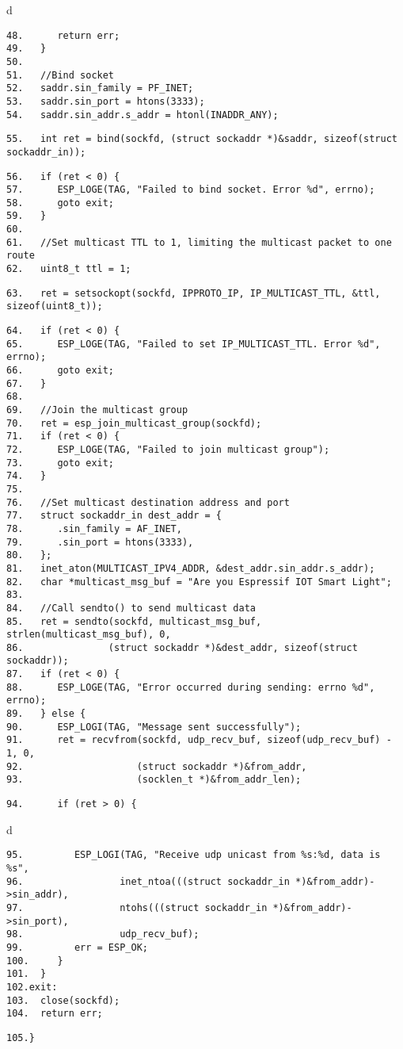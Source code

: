\documentclass[a4paper,12pt]{book}
\begin{document}
\begin{codebloc}
\begin{tabular}{d}
\vspace{2pt}
\begin{verbatim}
48.      return err;
49.   }
50.	
51.   //Bind socket
52.   saddr.sin_family = PF_INET;
53.   saddr.sin_port = htons(3333);
54.   saddr.sin_addr.s_addr = htonl(INADDR_ANY);
\end{verbatim}
\verb|55.   |\fontsize{9.5pt}{10pt}\selectfont\verb|int ret = bind(sockfd, (struct sockaddr *)&saddr, sizeof(struct sockaddr_in));|
\footnotesize
\begin{verbatim}
56.   if (ret < 0) {
57.      ESP_LOGE(TAG, "Failed to bind socket. Error %d", errno);
58.      goto exit;
59.   }
60.	
61.   //Set multicast TTL to 1, limiting the multicast packet to one route
62.   uint8_t ttl = 1;
\end{verbatim}
\verb|63.   |\fontsize{9.5pt}{10pt}\selectfont\verb|ret = setsockopt(sockfd, IPPROTO_IP, IP_MULTICAST_TTL, &ttl, sizeof(uint8_t));|
\footnotesize
\begin{verbatim}
64.   if (ret < 0) {
65.      ESP_LOGE(TAG, "Failed to set IP_MULTICAST_TTL. Error %d", errno);
66.      goto exit;
67.   }
68.	
69.   //Join the multicast group
70.   ret = esp_join_multicast_group(sockfd);
71.   if (ret < 0) {
72.      ESP_LOGE(TAG, "Failed to join multicast group");
73.      goto exit;
74.   }
75.	
76.   //Set multicast destination address and port
77.   struct sockaddr_in dest_addr = {
78.      .sin_family = AF_INET,
79.      .sin_port = htons(3333),
80.   };
81.   inet_aton(MULTICAST_IPV4_ADDR, &dest_addr.sin_addr.s_addr);
82.   char *multicast_msg_buf = "Are you Espressif IOT Smart Light";
83.	
84.   //Call sendto() to send multicast data
85.   ret = sendto(sockfd, multicast_msg_buf, strlen(multicast_msg_buf), 0,
86.               (struct sockaddr *)&dest_addr, sizeof(struct sockaddr));
87.   if (ret < 0) {
88.      ESP_LOGE(TAG, "Error occurred during sending: errno %d", errno);
89.   } else {
90.      ESP_LOGI(TAG, "Message sent successfully");
91.      ret = recvfrom(sockfd, udp_recv_buf, sizeof(udp_recv_buf) - 1, 0,
92.                    (struct sockaddr *)&from_addr,
93.                    (socklen_t *)&from_addr_len);
\end{verbatim}
\verb|94.      if (ret > 0) {|
\end{tabular}
\end{codebloc}

\begin{codebloc}
\begin{tabular}{d}
\vspace{2pt}
\begin{verbatim}
95.         ESP_LOGI(TAG, "Receive udp unicast from %s:%d, data is %s",
96.                 inet_ntoa(((struct sockaddr_in *)&from_addr)->sin_addr),
97.                 ntohs(((struct sockaddr_in *)&from_addr)->sin_port),
98.                 udp_recv_buf);
99.         err = ESP_OK;
100.     }
101.  }
102.exit:
103.  close(sockfd);
104.  return err;
\end{verbatim}
\verb|105.}|
\end{tabular}
\end{codebloc}
\end{document}
